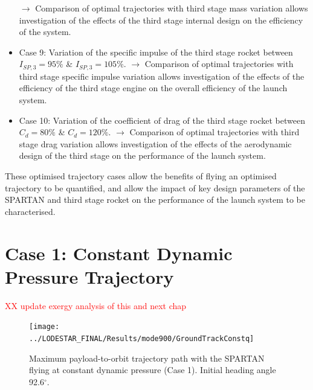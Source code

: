 \begin{itemize}
	\newline$\rightarrow$ Comparison of optimal trajectories with third stage mass variation allows investigation of the effects of the third stage internal design on the efficiency of the system. 
	\item Case 9: Variation of the specific impulse of the third stage rocket between $I_{SP,3} = 95\%$ \& $I_{SP,3} = 105\%$. 
	\newline$\rightarrow$ Comparison of optimal trajectories with third stage specific impulse variation allows investigation of the effects of the efficiency of the third stage engine on the overall efficiency of the launch system. 
	\item Case 10: Variation of the coefficient of drag of the third stage rocket between $C_d = 80\%$ \& $C_d = 120\%$.
	\newline$\rightarrow$ Comparison of optimal trajectories with third stage drag variation allows investigation of the effects of the aerodynamic design of the third stage on the performance of the launch system.
\end{itemize}
These optimised trajectory cases allow the benefits of flying an optimised trajectory to be quantified, and allow the impact of key design parameters of the SPARTAN and third stage rocket on the performance of the launch system to be characterised. 
  

\section{Case 1: Constant Dynamic Pressure Trajectory}
\textcolor{red}{XX update exergy analysis of this and next chap}

\begin{figure}[ht]
	\centering
	\texttt{[image: ../LODESTAR\_FINAL/Results/mode900/GroundTrackConstq]}
	\caption{Maximum payload-to-orbit trajectory path with the SPARTAN flying at constant dynamic pressure (Case 1). Initial heading angle 92.6$^\circ$.}
	\label{fig:GroundTrackConstq}
\end{figure}

